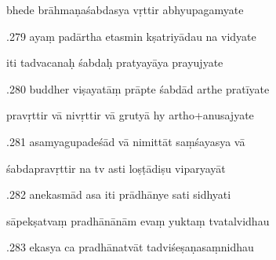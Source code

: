 \documentclass[article,12pt,a4paper]{memoir}%
\newcounter{parCount}
\begin{document}
	  
	  \pstart \leavevmode%
	bhede brāhmaṇaśabdasya vṛttir abhyupagamyate 
	{}
	\pend%
      

	  
	  \pstart {}.279 ayaṃ padārtha etasmin kṣatriyādau na vidyate 
	{}
	\pend%
      

	  
	  \pstart \leavevmode%
	iti tadvacanaḥ śabdaḥ pratyayāya prayujyate 
	{}
	\pend%
      

	  
	  \pstart {}.280 buddher viṣayatāṃ prāpte śabdād arthe pratīyate 
	{}
	\pend%
      

	  
	  \pstart \leavevmode%
	pravṛttir vā nivṛttir vā grutyā hy artho+anusajyate 
	{}
	\pend%
      

	  
	  \pstart {}.281 asamyagupadeśād vā nimittāt saṃśayasya vā 
	{}
	\pend%
      

	  
	  \pstart \leavevmode%
	śabdapravṛttir na tv asti loṣṭādiṣu viparyayāt 
	{}
	\pend%
      

	  
	  \pstart {}.282 anekasmād asa iti prādhānye sati sidhyati 
	{}
	\pend%
      

	  
	  \pstart \leavevmode%
	sāpekṣatvaṃ pradhānānām evaṃ yuktaṃ tvatalvidhau 
	{}
	\pend%
      

	  
	  \pstart {}.283 ekasya ca pradhānatvāt   tadviśeṣaṇasaṃnidhau 
	{}
	\pend%
      
\end{document}

